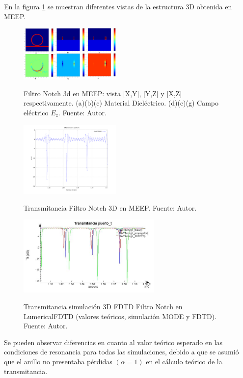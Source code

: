 \documentclass{IEEEtran}
\begin{document}
En la figura \ref{fig:notch_geometry} se muestran diferentes vistas de la 
estructura 3D obtenida en MEEP.

\begin{figure}
\caption{Filtro Notch 3d en MEEP: vista [X,Y], [Y,Z] y [X,Z] respectivamente. (a)(b)(c) Material Dieléctrico. (d)(e)(g) Campo eléctrico $E_z$. Fuente: Autor.}
\centering
\includegraphics[width=5cm,natwidth=900,natheight=500]{figs/notch3d.png}
\label{fig:notch_geometry}
\end{figure}

\begin{figure}
\caption{Transmitancia Filtro Notch 3D en MEEP. Fuente: Autor.}
\centering
\includegraphics[width=5cm,natwidth=1200,natheight=900]{figs/notch3d_T.png}
\label{fig:meep_res_n}
\end{figure}

\begin{figure}
\caption{Transmitancia simulación 3D FDTD Filtro Notch en LumericalFDTD (valores teóricos, simulación MODE y 
FDTD). Fuente: Autor.}
\centering
\includegraphics[width=7cm,natwidth=632,natheight=356]{figs/lum_Tt.jpg}
\label{fig:lum_t_fdtd_n}
\end{figure} 

Se pueden observar diferencias en cuanto al valor teórico esperado en las
condiciones de resonancia para todas las simulaciones,
debido a que se asumió que el anillo no presentaba pérdidas $(\alpha = 1)$ en
el cálculo teórico de la transmitancia.
\end{document}
